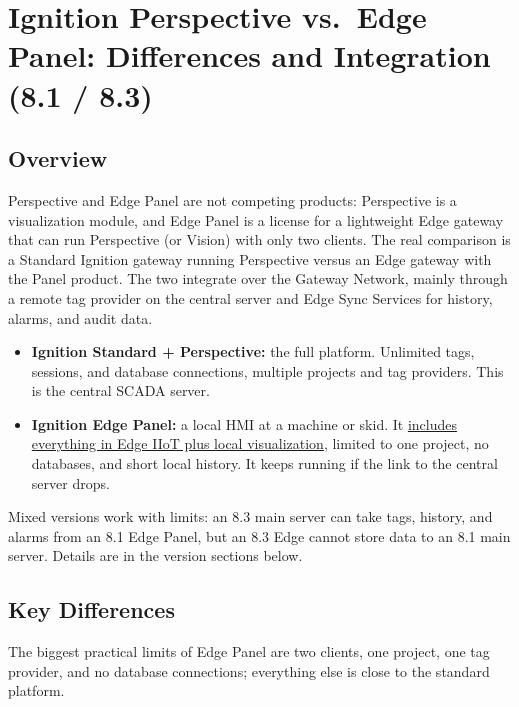 \chapter[Ignition Perspective vs.\ Edge Panel (8.1 / 8.3)]{Ignition Perspective vs.\ Edge Panel: Differences and Integration (8.1 / 8.3)}
\label{app:edge-panel}
\section{Overview}
Perspective and Edge Panel are not competing products: Perspective is a visualization module, and Edge Panel is a license for a lightweight Edge gateway that can run Perspective (or Vision) with only two clients. The real comparison is a Standard Ignition gateway running Perspective versus an Edge gateway with the Panel product. The two integrate over the Gateway Network, mainly through a remote tag provider on the central server and Edge Sync Services for history, alarms, and audit data.
\begin{itemize}[itemsep=2pt]
  \item \textbf{Ignition Standard + Perspective:} the full platform. Unlimited tags, sessions, and database connections, multiple projects and tag providers. This is the central SCADA server.
  \item \textbf{Ignition Edge Panel:} a local HMI at a machine or skid. It \href{https://docs.inductiveautomation.com/docs/8.3/other-editions/ignition-edge}{includes everything in Edge IIoT plus local visualization}, limited to one project, no databases, and short local history. It keeps running if the link to the central server drops.
\end{itemize}
Mixed versions work with limits: an 8.3 main server can take tags, history, and alarms from an 8.1 Edge Panel, but an 8.3 Edge cannot store data to an 8.1 main server. Details are in the version sections below.

\section{Key Differences}
The biggest practical limits of Edge Panel are two clients, one project, one tag provider, and no database connections; everything else is close to the standard platform.

